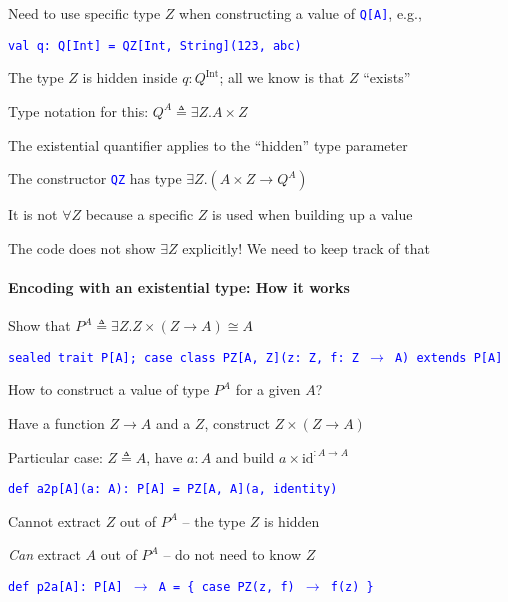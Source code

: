 Need to use specific type $Z$ when constructing a value of \texttt{\textcolor{blue}{\footnotesize{}Q{[}A{]}}},
e.g.,

\texttt{\textcolor{blue}{\footnotesize{}val q: Q{[}Int{]} = QZ{[}Int,
String{]}(123, \textquotedbl abc\textquotedbl )}}{\footnotesize\par}

The type $Z$ is hidden inside $q:Q^{\text{Int}}$; all we know is
that $Z$ \textsf{``}exists\textsf{''}

Type notation for this: $Q^{A}\triangleq\exists Z.A\times Z$

The existential quantifier applies to the \textsf{``}hidden\textsf{''} type parameter

The constructor \texttt{\textcolor{blue}{\footnotesize{}QZ}} has type
$\exists Z.\left(A\times Z\rightarrow Q^{A}\right)$

It is not $\forall Z$ because a specific $Z$ is used when building
up a value

The code does not show $\exists Z$ explicitly! We need to keep track
of that


\paragraph{Encoding with an existential type: How it works}

Show that $P^{A}\triangleq\exists Z.Z\times\left(Z\rightarrow A\right)\cong A$

\texttt{\textcolor{blue}{\footnotesize{}sealed trait P{[}A{]}; case
class PZ{[}A, Z{]}(z: Z, f: Z $\rightarrow$ A) extends P{[}A{]}}}{\footnotesize\par}

How to construct a value of type $P^{A}$ for a given $A$?

Have a function $Z\rightarrow A$ and a $Z$, construct $Z\times\left(Z\rightarrow A\right)$

Particular case: $Z\triangleq A$, have $a:A$ and build $a\times\text{id}^{:A\rightarrow A}$

\texttt{\textcolor{blue}{\footnotesize{}def a2p{[}A{]}(a: A): P{[}A{]}
= PZ{[}A, A{]}(a, identity)}}{\footnotesize\par}

Cannot extract $Z$ out of $P^{A}$ – the type $Z$ is hidden

\emph{Can} extract $A$ out of $P^{A}$ – do not need to know $Z$

\texttt{\textcolor{blue}{\footnotesize{}def p2a{[}A{]}: P{[}A{]} $\rightarrow$
A = \{ case PZ(z, f) $\rightarrow$ f(z) \}}}{\footnotesize\par}

